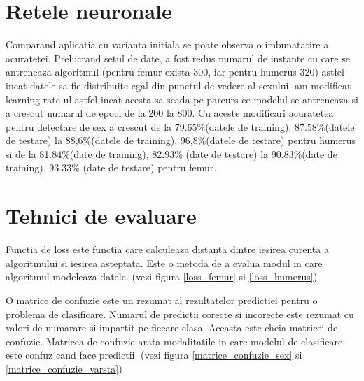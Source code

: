 \documentclass[runningheads,a4paper,11pt]{report}
\begin{document}
\section{Retele neuronale}
\label{reteleComplexitate}
Comparand aplicatia cu varianta initiala se poate observa o imbunatatire a acuratetei. Prelucrand setul de date, a fost redus numarul de instante cu care se antreneaza algoritmul (pentru femur exista 300, iar pentru humerus 320) astfel incat datele sa fie distribuite egal din punctul de vedere al sexului, am modificat learning rate-ul astfel incat acesta sa scada pe parcurs ce modelul se antreneaza si a crescut numarul de epoci de la 200 la 800.
Cu aceste modificari acuratetea pentru detectare de sex a crescut de la 79.65\%(datele de training), 87.58\%(datele de testare) la 88,6\%(datele de training), 96,8\%(datele de testare) pentru humerus si de la 81.84\%(date de training), 82.93\% (date de testare) la 90.83\%(date de training), 93.33\% (date de testare) pentru femur. \newline \newline

\section{Tehnici de evaluare}
\label{tehnici}
Functia de loss este functia care calculeaza distanta dintre iesirea curenta a algoritmului si iesirea asteptata. Este o metoda de a evalua modul in care algoritmul modeleaza datele. (vezi figura \ref{loss_femur} si \ref{loss_humerus})
\newline

\noindent O matrice de confuzie este un rezumat al rezultatelor predictiei pentru o problema de clasificare. Numarul de predictii corecte si incorecte este rezumat cu valori de numarare si impartit pe fiecare clasa. Aceasta este cheia matricei de confuzie. Matricea de confuzie arata modalitatile in care modelul de clasificare este confuz cand face predictii. (vezi figura \ref{matrice_confuzie_sex} si \ref{matrice_confuzie_varsta})

\hfill \break
\hfill \break
\hfill \break
\end{document}
